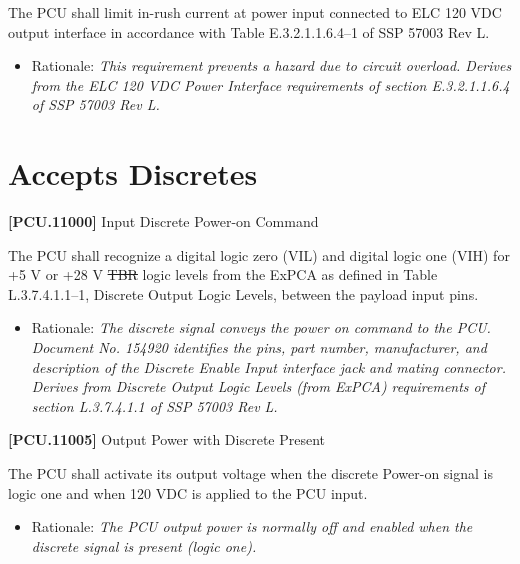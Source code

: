 \documentclass[12pt,oneside,oldfontcommands]{memoir}
\providecommand{\DIFaddtex}[1]{{\protect\color{blue}\uwave{#1}}} %
\providecommand{\DIFdeltex}[1]{{\protect\color{red}\sout{#1}}}                      %
\providecommand{\DIFaddbegin}{} %
\providecommand{\DIFaddend}{} %
\providecommand{\DIFdelbegin}{} %
\providecommand{\DIFdelend}{} %
\providecommand{\DIFadd}[1]{\texorpdfstring{\DIFaddtex{#1}}{#1}} %
\providecommand{\DIFdel}[1]{\texorpdfstring{\DIFdeltex{#1}}{}} %
\newcommand{\DIFscaledelfig}{0.5}
\newlength{\DIFdelgraphicswidth} %
\newlength{\DIFdelgraphicsheight} %
\newcommand{\DIFaddincludegraphics}[2][]{{\color{blue}\fbox{\DIFOincludegraphics[#1]{#2}}}} %
\newcommand{\DIFdelincludegraphics}[2][]{%
\sbox{\DIFdelgraphicsbox}{\DIFOincludegraphics[#1]{#2}}%
\settoboxwidth{\DIFdelgraphicswidth}{\DIFdelgraphicsbox} %
\settoboxtotalheight{\DIFdelgraphicsheight}{\DIFdelgraphicsbox} %
\scalebox{\DIFscaledelfig}{%
\parbox[b]{\DIFdelgraphicswidth}{\usebox{\DIFdelgraphicsbox}\\[-\baselineskip] \rule{\DIFdelgraphicswidth}{0em}}\llap{\resizebox{\DIFdelgraphicswidth}{\DIFdelgraphicsheight}{%
\setlength{\unitlength}{\DIFdelgraphicswidth}%
\begin{picture}(1,1)%
\thicklines\linethickness{2pt} %
{\color[rgb]{1,0,0}\put(0,0){\framebox(1,1){}}}%
{\color[rgb]{1,0,0}\put(0,0){\line( 1,1){1}}}%
{\color[rgb]{1,0,0}\put(0,1){\line(1,-1){1}}}%
\end{picture}%
}\hspace*{3pt}}} %
} %
\DeclareRobustCommand{\DIFaddbegin}{\DIFOaddbegin \let\includegraphics\DIFaddincludegraphics} %
\DeclareRobustCommand{\DIFaddend}{\DIFOaddend \let\includegraphics\DIFOincludegraphics} %
\DeclareRobustCommand{\DIFdelbegin}{\DIFOdelbegin \let\includegraphics\DIFdelincludegraphics} %
\DeclareRobustCommand{\DIFdelend}{\DIFOaddend \let\includegraphics\DIFOincludegraphics} %
\begin{document}
The \gls{PCU} shall limit in-rush current at power input connected to \gls{ELC} 120 \gls{VDC} output interface in accordance with Table E.3.2.1.1.6.4--1 of SSP 57003 Rev L.

\begin{itemize}
\item{} Rationale: \emph{This requirement prevents a hazard due to circuit overload. Derives from the ELC 120 VDC Power Interface requirements of section E.3.2.1.1.6.4 of SSP 57003 Rev L.}

\end{itemize}

\section{Accepts Discretes}
\label{acceptsdiscretes}

\textbf{[PCU.11000]} Input Discrete Power-on Command

The \gls{PCU} shall recognize a digital logic zero (VIL) and digital logic one (VIH) for +5 V or +28 V \DIFdelbegin \DIFdel{TBR}%
\DIFdelend \DIFaddbegin \DIFadd{(TBR}\label{tbx_5}\DIFadd{) }\DIFaddend logic levels from the ExPCA as defined in Table L.3.7.4.1.1--1, Discrete Output Logic Levels, between the payload input pins.

\begin{itemize}
\item{} Rationale: \emph{The discrete signal conveys the power on command to the PCU. Document No. 154920 identifies the pins, part number, manufacturer, and description of the Discrete Enable Input interface jack and mating connector. Derives from Discrete Output Logic Levels (from ExPCA) requirements of section L.3.7.4.1.1 of SSP 57003 Rev L.}

\end{itemize}

\textbf{[PCU.11005]} Output Power with Discrete Present

The \gls{PCU} shall activate its output voltage when the discrete Power-on signal is logic one and when 120 \gls{VDC} is applied to the \gls{PCU} input.

\begin{itemize}
\item{} Rationale: \emph{The PCU output power is normally off and enabled when the discrete signal is present (logic one).}

\end{itemize}
\end{document}

